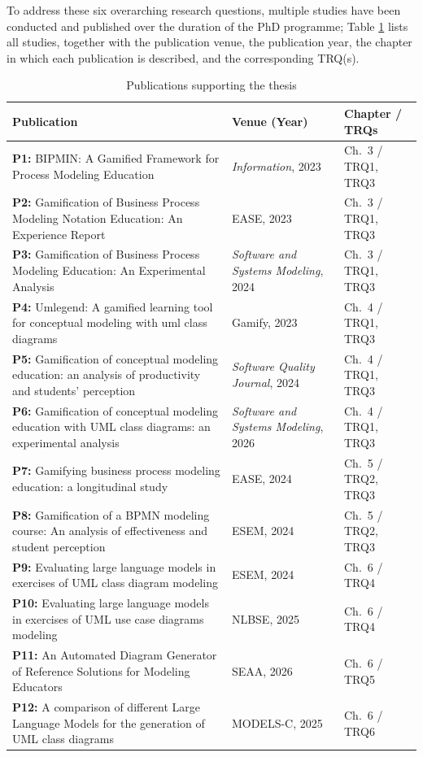 To address these six overarching research questions, multiple studies have been conducted and published over the duration of the PhD programme; Table \ref{tab:publications} lists all studies, together with the publication venue, the publication year, the chapter in which each publication is described, and the corresponding TRQ(s).

\renewcommand{\arraystretch}{1.3}
\begin{table}[ht]
\small
\centering
\caption{Publications supporting the thesis}
\label{tab:publications}
\begin{tabular}{p{} p{} p{}}
\toprule
\textbf{Publication} & \textbf{Venue (Year)} & \textbf{Chapter / TRQs} \\
\midrule
\textbf{P1:} BIPMIN: A Gamified Framework for Process Modeling Education
  & \textit{Information}, 2023 & Ch.~3 / TRQ1, TRQ3 \\
\midrule
\textbf{P2:} Gamification of Business Process Modeling Notation Education: An Experience Report
  & EASE, 2023 & Ch.~3 / TRQ1, TRQ3 \\
\midrule
\textbf{P3:} Gamification of Business Process Modeling Education: An Experimental Analysis
  & \textit{Software and Systems Modeling}, 2024 & Ch.~3 / TRQ1, TRQ3 \\
\midrule
\textbf{P4:} Umlegend: A gamified learning tool for conceptual modeling with uml class diagrams
  & Gamify, 2023 & Ch.~4 / TRQ1, TRQ3 \\
\midrule
\textbf{P5:} Gamification of conceptual modeling education: an analysis of productivity and students’ perception
  & \textit{Software Quality Journal}, 2024 & Ch.~4 / TRQ1, TRQ3 \\
\midrule
\textbf{P6:} Gamification of conceptual modeling education with UML class diagrams: an experimental analysis
  & \textit{Software and Systems Modeling}, 2026 & Ch.~4 / TRQ1, TRQ3 \\
\midrule
\textbf{P7:} Gamifying business process modeling education: a longitudinal study
  & EASE, 2024 & Ch.~5 / TRQ2, TRQ3 \\
\midrule
\textbf{P8:} Gamification of a BPMN modeling course: An analysis of effectiveness and student perception
  & ESEM, 2024 & Ch.~5 / TRQ2, TRQ3 \\
\midrule
\textbf{P9:} Evaluating large language models in exercises of UML class diagram modeling
  & ESEM, 2024 & Ch.~6 / TRQ4 \\
\midrule
\textbf{P10:} Evaluating large language models in exercises of UML use case diagrams modeling
  & NLBSE, 2025 & Ch.~6 / TRQ4 \\
\midrule
\textbf{P11:} An Automated Diagram Generator of Reference Solutions for Modeling Educators
  & SEAA, 2026 & Ch.~6 / TRQ5 \\
\midrule
\textbf{P12:} A comparison of different Large Language Models for the generation of UML class diagrams
  & MODELS-C, 2025 & Ch.~6 / TRQ6 \\
\bottomrule
\end{tabular}
\end{table}


